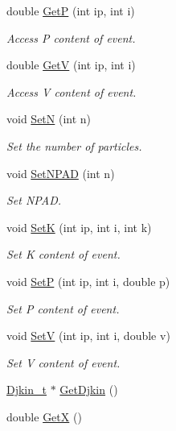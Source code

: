 \begin{DoxyCompactItemize}
double \hyperlink{class_t_djangoh_a2bc14d05d493e604f9f7fef847c19c9b}{GetP} (int ip, int i)
\begin{DoxyCompactList}\small\item\em Access P content of event. \end{DoxyCompactList}\item 
double \hyperlink{class_t_djangoh_a4993a87fef8917b9ed8a55811aa2daf6}{GetV} (int ip, int i)
\begin{DoxyCompactList}\small\item\em Access V content of event. \end{DoxyCompactList}\item 
void \hyperlink{class_t_djangoh_ac15b9862e954349fd9f0911c71e0e664}{SetN} (int n)
\begin{DoxyCompactList}\small\item\em Set the number of particles. \end{DoxyCompactList}\item 
void \hyperlink{class_t_djangoh_a0ed7bb7e7433a6385b5838ce519168a2}{Set\+N\+P\+AD} (int n)
\begin{DoxyCompactList}\small\item\em Set N\+P\+AD. \end{DoxyCompactList}\item 
void \hyperlink{class_t_djangoh_a045a7fabe350589453e240bff98ca54b}{SetK} (int ip, int i, int k)
\begin{DoxyCompactList}\small\item\em Set K content of event. \end{DoxyCompactList}\item 
void \hyperlink{class_t_djangoh_aa9cfa62ac6bf01a7f5214cc62cdae34c}{SetP} (int ip, int i, double p)
\begin{DoxyCompactList}\small\item\em Set P content of event. \end{DoxyCompactList}\item 
void \hyperlink{class_t_djangoh_a472e228f316f1473c940dfa37c22637c}{SetV} (int ip, int i, double v)
\begin{DoxyCompactList}\small\item\em Set V content of event. \end{DoxyCompactList}\item 
\hyperlink{struct_djkin__t}{Djkin\+\_\+t} $\ast$ \hyperlink{class_t_djangoh_a4f5a22f9af97e7c84660c94cd354f780}{Get\+Djkin} ()
\item 
double \hyperlink{class_t_djangoh_aa2d4a28a97826cf32b9d623c581da9de}{GetX} ()

\end{DoxyCompactItemize}
